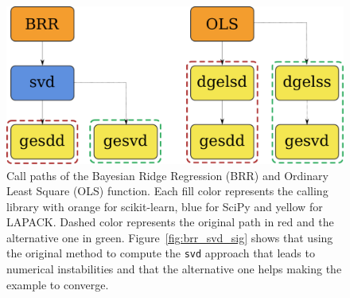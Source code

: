 \documentclass[11pt]{article}
\begin{document}



\begin{figure}
    \centering
    \includegraphics[width=0.5\linewidth]{figure/BRR/call_path.pdf}
    \caption{Call paths of the Bayesian Ridge Regression (BRR) and 
    Ordinary Least Square (OLS) function. Each fill color represents the calling library
    with orange for scikit-learn, blue for SciPy and yellow for LAPACK.
    Dashed color represents the original path in red and the alternative one in green.
    Figure~\ref{fig:brr_svd_sig} shows that using the original method to compute the \texttt{svd}
    approach that leads to numerical instabilities and that the alternative one helps 
    making the example to converge.
    }
    \label{fig:call_path_brr}
\end{figure}
\end{document}
